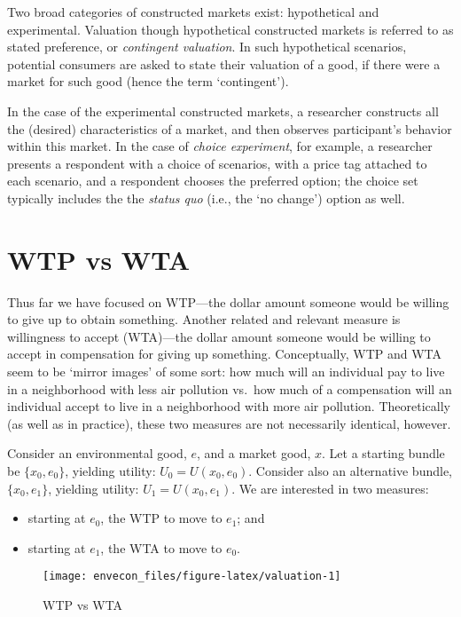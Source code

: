 \documentclass[
]{book}
\providecommand{\tightlist}{%
  \setlength{\itemsep}{0pt}\setlength{\parskip}{0pt}}
\begin{document}
Two broad categories of constructed markets exist: hypothetical and experimental. Valuation though hypothetical constructed markets is referred to as stated preference, or \emph{contingent valuation}. In such hypothetical scenarios, potential consumers are asked to state their valuation of a good, if there were a market for such good (hence the term `contingent').

In the case of the experimental constructed markets, a researcher constructs all the (desired) characteristics of a market, and then observes participant's behavior within this market. In the case of \emph{choice experiment}, for example, a researcher presents a respondent with a choice of scenarios, with a price tag attached to each scenario, and a respondent chooses the preferred option; the choice set typically includes the the \emph{status quo} (i.e., the `no change') option as well.

\hypertarget{wtp-vs-wta}{%
\section{WTP vs WTA}\label{wtp-vs-wta}}

Thus far we have focused on WTP---the dollar amount someone would be willing to give up to obtain something. Another related and relevant measure is willingness to accept (WTA)---the dollar amount someone would be willing to accept in compensation for giving up something.
Conceptually, WTP and WTA seem to be `mirror images' of some sort: how much will an individual pay to live in a neighborhood with less air pollution vs.~how much of a compensation will an individual accept to live in a neighborhood with more air pollution. Theoretically (as well as in practice), these two measures are not necessarily identical, however.

Consider an environmental good, \(e\), and a market good, \(x\). Let a starting bundle be \(\{x_0,e_0\}\), yielding utility: \(U_0 = U(x_0,e_0)\). Consider also an alternative bundle, \(\{x_0,e_1\}\), yielding utility: \(U_1 = U(x_0,e_1)\). We are interested in two measures:

\begin{itemize}
\tightlist
\item
  starting at \(e_0\), the WTP to move to \(e_1\); and
\item
  starting at \(e_1\), the WTA to move to \(e_0\).
\end{itemize}

\begin{figure}

{\centering \texttt{[image: envecon\_files/figure-latex/valuation-1]} 

}

\caption{WTP vs WTA}\label{fig:valuation}
\end{figure}
\end{document}
